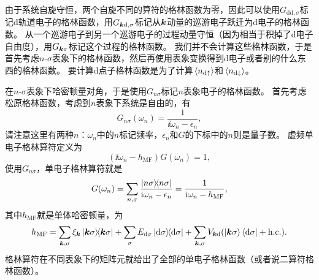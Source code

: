 由于系统自旋守恒，两个自旋不同的算符的格林函数为零，因此可以使用$G_{\text{dd}, \sigma}$标记d轨道电子的格林函数，用$G_{\vb*{k} \text{d}, \sigma}$标记从$\vb*{k}$动量的巡游电子跃迁为d电子的格林函数。
从一个巡游电子到另一个巡游电子的过程动量守恒（因为相当于积掉了d电子自由度），用$G_{\vb*{k}\sigma}$标记这个过程的格林函数。
我们并不会计算这些格林函数，于是首先考虑$n$-$\sigma$表象下的格林函数，然后再使用表象变换得到d电子或者别的什么东西的格林函数。
要计算d点子格林函数是为了计算$\expval*{{n}_{\text{d}\uparrow}}$和$\expval*{{n}_{\text{d}\downarrow}}$。

在$n$-$\sigma$表象下哈密顿量对角，于是使用$G_{n\sigma}$标记$n$表象电子的格林函数。
首先考虑松原格林函数，考虑到$n$表象下系统是自由的，有
\begin{equation}
    G_{n\sigma} (\omega_n) = \frac{1}{\ii \omega_n - \epsilon_n},
\end{equation}
请注意这里有两种$n$：$\omega_n$中的$n$标记频率，$\epsilon_n$和$G$的下标中的$n$则是量子数。
虚频单电子格林算符定义为
\[
    (\ii \omega_n - {h}_\text{MF}) {G}(\omega_n) = 1,
\]
使用$G_{n \sigma}$，单电子格林算符就是
\begin{equation}
    {G}(\omega_n) = \sum_{n, \sigma} \frac{\dyad{n\sigma}}{\ii \omega_n - \epsilon_n} = \frac{1}{\ii \omega_n - {h}_\text{MF}},
\end{equation}
其中${h}_\text{MF}$就是单体哈密顿量，为
\begin{equation}
    {h}_\text{MF} = \sum_{\vb*{k}, \sigma} \xi_{\vb*{k}} \dyad{\vb*{k} \sigma} + \sum_\sigma E_{\text{d} \sigma} \dyad{\text{d} \sigma} + \sum_{\vb*{k}, \sigma} V_{\vb*{k} \text{d}} ( \ket{\vb*{k} \sigma} \bra{\text{d} \sigma} + \text{h.c.} ).
    \label{eq:anderson-green-operator}
\end{equation}
格林算符在不同表象下的矩阵元就给出了全部的单电子格林函数（或者说二算符格林函数）。

